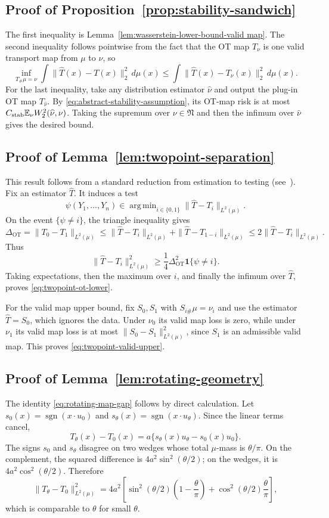 \documentclass[11pt,twoside]{article}
\DeclareMathOperator{\sgn}{sgn}
\DeclareMathOperator*{\argmin}{arg\,min}
\newcommand{\OT}{\mathrm{OT}}
\begin{document}
\subsection{Proof of Proposition~\ref{prop:stability-sandwich}}
The first inequality is Lemma~\ref{lem:wasserstein-lower-bound-valid map}. The second inequality follows pointwise from the fact that the OT map $T_\nu$ is one valid transport map from $\mu$ to $\nu$, so
\[
\inf_{T_\#\mu=\nu}
\int \|\widehat T(x)-T(x)\|_2^2\,d\mu(x)
\leq
\int \|\widehat T(x)-T_\nu(x)\|_2^2\,d\mu(x).
\]
For the last inequality, take any distribution estimator $\widehat\nu$ and output the plug-in OT map $T_{\widehat\nu}$. By \eqref{eq:abstract-stability-assumption}, its OT-map risk is at most $C_{\rm stab}\mathbb E_\nu W_2^2(\widehat\nu,\nu)$. Taking the supremum over $\nu\in\mathfrak N$ and then the infimum over $\widehat\nu$ gives the desired bound.


\subsection{Proof of Lemma~\ref{lem:twopoint-separation}}
This result follows from a standard reduction from estimation to testing (see~\cite{tsybakov2008}).
Fix an estimator $\widehat T$. It induces a test
\[
\psi(Y_1,\ldots,Y_n)
\in
\argmin_{i\in\{0,1\}}
\|\widehat T-T_i\|_{L^2(\mu)}.
\]
On the event $\{\psi\neq i\}$, the triangle inequality gives
\[
\Delta_{\OT}
=
\|T_0-T_1\|_{L^2(\mu)}
\leq
\|\widehat T-T_i\|_{L^2(\mu)}+
\|\widehat T-T_{1-i}\|_{L^2(\mu)}
\leq
2\|\widehat T-T_i\|_{L^2(\mu)}.
\]
Thus
\[
\|\widehat T-T_i\|_{L^2(\mu)}^2
\geq
\frac14\Delta_{\OT}^2\mathbf 1\{\psi\neq i\}.
\]
Taking expectations, then the maximum over $i$, and finally the infimum over $\widehat T$, proves \eqref{eq:twopoint-ot-lower}.

For the valid map upper bound, fix $S_0,S_1$ with $S_{i\#}\mu=\nu_i$ and use the estimator $\widehat T=S_0$, which ignores the data. Under $\nu_0$ its valid map loss is zero, while under $\nu_1$ its valid map loss is at most $\|S_0-S_1\|_{L^2(\mu)}^2$, since $S_1$ is an admissible valid map. This proves \eqref{eq:twopoint-valid-upper}.


\subsection{Proof of Lemma~\ref{lem:rotating-geometry}}
The identity \eqref{eq:rotating-map-gap} follows by direct calculation. Let $s_0(x)=\sgn(x\cdot u_0)$ and $s_\theta(x)=\sgn(x\cdot u_\theta)$. Since the linear terms cancel,
\[
T_\theta(x)-T_0(x)=a\{s_\theta(x)u_\theta-s_0(x)u_0\}.
\]
The signs $s_0$ and $s_\theta$ disagree on two wedges whose total $\mu$-mass is $\theta/\pi$. On the complement, the squared difference is $4a^2\sin^2(\theta/2)$; on the wedges, it is $4a^2\cos^2(\theta/2)$. Therefore
\[
\|T_\theta-T_0\|_{L^2(\mu)}^2
=
4a^2\left[
\sin^2(\theta/2)\left(1-\frac{\theta}{\pi}\right)
+
\cos^2(\theta/2)\frac{\theta}{\pi}
\right],
\]
which is comparable to $\theta$ for small $\theta$.
\end{document}
